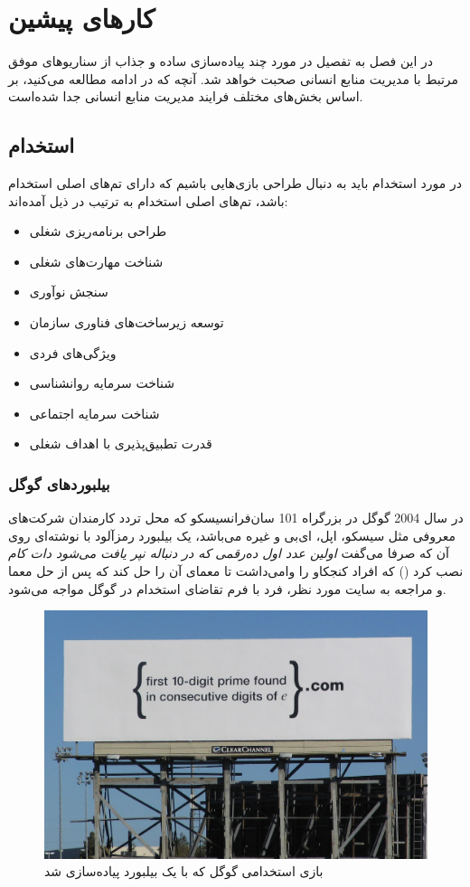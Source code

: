 \chapter{کارهای پیشین}
در این فصل به تفصیل در مورد چند پیاده‌سازی ساده و جذاب از سناریوهای موفق مرتبط با مدیریت منابع انسانی صحبت خواهد شد. آنچه که در ادامه مطالعه می‌کنید، بر اساس بخش‌های مختلف فرایند مدیریت منابع انسانی جدا شده‌است.
\section{استخدام}
در مورد استخدام باید به دنبال طراحی بازی‌هایی باشیم که دارای تم‌های اصلی استخدام باشد، تم‌های اصلی استخدام به ترتیب در ذیل آمده‌اند:
\begin{itemize}
	\item طراحی برنامه‌ریزی شغلی
	\item شناخت مهارت‌های شغلی
	\item سنجش نوآوری
	\item توسعه زیرساخت‌های فناوری سازمان
	\item ویژگی‌های فردی
	\item شناخت سرمایه روانشناسی
	\item شناخت سرمایه اجتماعی
	\item قدرت تطبیق‌پذیری با اهداف شغلی
\end{itemize}
\subsection{بیلبوردهای گوگل}
در سال 2004 گوگل در بزرگراه 101 سان‌فرانسیسکو که محل تردد کارمندان شرکت‌های معروفی مثل سیسکو، اپل، ای‌بی و غیره می‌باشد، یک بیلبورد رمزآلود با نوشته‌ای روی آن که صرفا می‌گفت \textit{اولین عدد اول ده‌رقمی که در دنباله نپر یافت می‌شود دات کام} نصب کرد () که افراد کنجکاو را وامی‌داشت تا معمای آن را حل کند که پس از حل معما و مراجعه به سایت مورد نظر، فرد با فرم تقاضای استخدام در گوگل مواجه می‌شود.

\begin{figure}[!htb]
	\centering
	\includegraphics[width=\textwidth]{Figures/eprime.jpg}
	\caption{بازی استخدامی گوگل که با یک بیلبورد پیاده‌سازی شد}
	\label{fig:google}
\end{figure}

